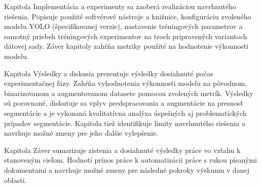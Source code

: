 Kapitola Implementácia a experimenty sa zaoberá realizáciou navrhnutého riešenia. Popisuje použité softvérové nástroje a knižnice, konfiguráciu zvoleného modelu YOLO (špecifikovanej verzie), nastavenie tréningových parametrov a samotný priebeh tréningových experimentov na troch pripravených variantoch dátovej sady. Záver kapitoly zahŕňa metriky použité na hodnotenie výkonnosti modelu.

Kapitola Výsledky a diskusia prezentuje výsledky dosiahnuté počas experimentačnej fázy. Zahŕňa vyhodnotenia výkonnosti modelu na pôvodnom, binarizovanom a augmentovanom datasete pomocou zvolených metrík. Výsledky sú porovnané, diskutuje sa vplyv predspracovania a augmentácie na presnosť segmentácie a je vykonaná kvalitatívna analýza úspešných aj problematických prípadov segmentácie. Kapitola tiež identifikuje limity navrhnutého riešenia a navrhuje možné zmeny pre jeho ďalšie vylepšenie.

Kapitola Záver sumarizuje zistenia a dosiahnuté výsledky práce vo vzťahu k stanoveným cieľom. Hodnotí prínos práce k automatizácii práce s rukou písanými dokumentami a navrhuje možné zmeny pre následné pokroky výskumu v danej oblasti.